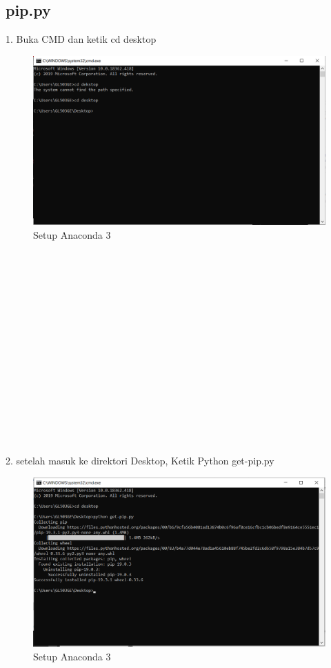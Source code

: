 \documentclass{article}
\begin{document}
\subsection{ pip.py }
1. Buka CMD dan ketik cd desktop
\begin{figure}[h]
	\centering
		\includegraphics[scale=0.5]{Gambar/B1.PNG}
		\caption{Setup Anaconda 3}
\end{figure}
\\
\\
\\
\\
\\
\\
\\
\\
\\
\\
\\
\\
\\
\\
\\
2. setelah masuk ke direktori Desktop, Ketik Python get-pip.py
\begin{figure}[h]
	\centering
		\includegraphics[scale=0.5]{Gambar/B2.PNG}
		\caption{Setup Anaconda 3}
\end{figure}
\end{document}
